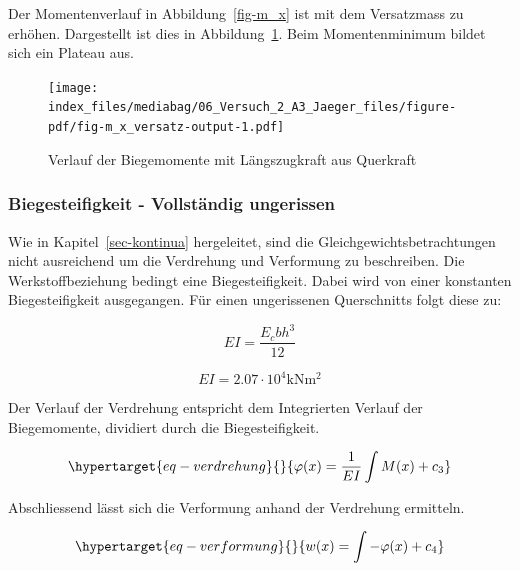 \documentclass[
  letterpaper,
]{scrreprt}
\begin{document}
Der Momentenverlauf in Abbildung~\ref{fig-m_x} ist mit dem Versatzmass
zu erhöhen. Dargestellt ist dies in Abbildung~\ref{fig-m_x_versatz}.
Beim Momentenminimum bildet sich ein Plateau aus.

\begin{figure}[H]

{\centering \texttt{[image: index\_files/mediabag/06\_Versuch\_2\_A3\_Jaeger\_files/figure-pdf/fig-m\_x\_versatz-output-1.pdf]}

}

\caption{\label{fig-m_x_versatz}Verlauf der Biegemomente mit
Längszugkraft aus Querkraft}

\end{figure}

\hypertarget{biegesteifigkeit---vollstuxe4ndig-ungerissen}{%
\subsubsection{Biegesteifigkeit - Vollständig
ungerissen}\label{biegesteifigkeit---vollstuxe4ndig-ungerissen}}

Wie in Kapitel~\ref{sec-kontinua} hergeleitet, sind die
Gleichgewichtsbetrachtungen nicht ausreichend um die Verdrehung und
Verformung zu beschreiben. Die Werkstoffbeziehung bedingt eine
Biegesteifigkeit. Dabei wird von einer konstanten Biegesteifigkeit
ausgegangen. Für einen ungerissenen Querschnitts folgt diese zu:

\begin{equation}EI = \frac{E_{c} b h^{3}}{12}\end{equation}

\begin{equation}EI = 2.07 \cdot 10^{4} \text{kN} \text{m}^{2}\end{equation}

Der Verlauf der Verdrehung entspricht dem Integrierten Verlauf der
Biegemomente, dividiert durch die Biegesteifigkeit.

\begin{equation}\protect\hypertarget{eq-verdrehung}{}{
\varphi(x) = \frac{1}{EI}\int M(x) + c_3
}\label{eq-verdrehung}\end{equation}

Abschliessend lässt sich die Verformung anhand der Verdrehung ermitteln.

\begin{equation}\protect\hypertarget{eq-verformung}{}{
w(x) = \int -\varphi(x) + c_4
}\label{eq-verformung}\end{equation}
\end{document}
